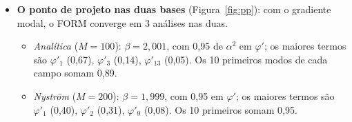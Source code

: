 \documentclass[11pt,a4paper]{article}
\begin{document}
\begin{itemize}
    Eq.~58), $\partial F/\partial c'(\bm x) = D_c/\mathrm{Den}$ e
    $\partial F/\partial\tan\varphi'(\bm x) = D_\varphi\cos^2\varphi^*/\mathrm{Den}$, com
    $\mathrm{Den} = \int (D_c c^* + D_\varphi\sin\varphi^*\cos\varphi^*)$. A taxa $\dot\varepsilon_v$ do mecanismo é
    aproximada pela deformação plástica volumétrica no colapso, e a escala se cancela. A regra da cadeia com
    \eqref{eq:dlnxi} dá o gradiente nos modos:
    \begin{equation}
      \frac{\partial g}{\partial \xi_{c,k}} = \sum_p W_p\big[\sigma_c\, a_c(\bm x_p) + \sigma_\varphi\rho\,
      a_\varphi(\bm x_p)\big]\,\psi_k(\bm x_p), \qquad
      \frac{\partial g}{\partial \xi_{\varphi,k}} = \sum_p W_p\,\sigma_\varphi\sqrt{1 - \rho^2}\,
      a_\varphi(\bm x_p)\,\psi_k(\bm x_p),
      \label{eq:gradmodal}
    \end{equation}
    com $a_c = c'\,\partial F/\partial c'$ e $a_\varphi = \varphi'\sec^2\varphi'\,\partial F/\partial\tan\varphi'$ (as
    sensibilidades do FS a $\ln c'$ e a $\ln\varphi'$, por unidade de área). A soma corre nos pontos de integração $p$ que
    plastificam ($\dot\varepsilon_v > 0$), com peso $W_p$. \textbf{A base entra só por $\psi_k(\bm x_p)$:}
    \begin{equation*}
      \text{analítica: } \psi_k(\bm x_p) = \sqrt{\lambda^x_i\lambda^y_j}\; f^x_i(x_p - x_c)\, f^y_j(y_p - y_c); \qquad
      \text{Nyström: } \psi_k(\bm x_p) = \lambda_k^{-1/2}\textstyle\sum_j w_j\, C(\bm x_p, \bm x_j)\, f_k(\bm x_j)
      \ \ \eqref{eq:nystrom}.
    \end{equation*}
    O mesmo código (\texttt{RandomField::ModeValues}) dá o gradiente nas duas bases. Custa \textbf{uma} análise por
    iteração, qualquer que seja $M$, contra $4M + 1$.
  \item \textbf{O ponto de projeto nas duas bases} (Figura~\ref{fig:pp}): com o gradiente modal, o FORM converge em 3
    análises nas duas.
    \begin{itemize}
      \item \emph{Analítica} ($M = 100$): $\beta = 2{,}001$, com 0{,}95
        de $\alpha^2$ em $\varphi'$; os maiores termos são $\varphi'_{1}$ (0{,}67), $\varphi'_{3}$ (0{,}14), $\varphi'_{13}$ (0{,}05). Os 10 primeiros modos de cada campo somam
        0{,}89.
      \item \emph{Nyström} ($M = 200$): $\beta = 1{,}999$, com 0{,}95
        em $\varphi'$; os maiores termos são $\varphi'_{1}$ (0{,}40), $\varphi'_{2}$ (0{,}31), $\varphi'_{9}$ (0{,}08). Os 10 primeiros somam 0{,}95.
    \end{itemize}

\end{itemize}
\end{document}
